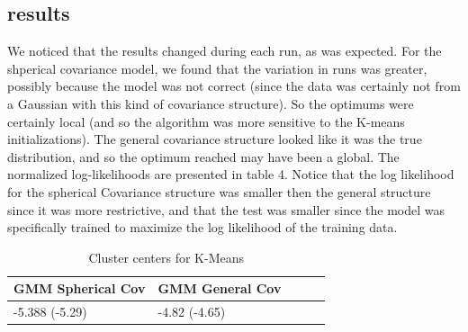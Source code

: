 \documentclass[paper=a4, fontsize=11pt]{scrartcl} %
\numberwithin{equation}{section} %
\numberwithin{figure}{section} %
\numberwithin{table}{section} %
\begin{document}
\subsection{results}

We noticed that the results changed during each run, as was expected. For the shperical covariance model, we found that the variation in runs was greater, possibly because the model was not correct (since the data was certainly not from a Gaussian with this kind of covariance structure). So the optimums were certainly local (and so the algorithm was more sensitive to the K-means initializations). The general covariance structure looked like it was the true distribution, and so the optimum reached may have been a global. The normalized log-likelihoods are presented in table 4. Notice that the log likelihood for the spherical Covariance structure was smaller then the general structure since it was more restrictive, and that the test was smaller since the model was specifically trained to maximize the log likelihood of the training data.

	\begin{table}
		\caption {Cluster centers for K-Means} \label{tab:title} 
		\begin{center}		
			\begin{tabular}{*5l}   
				\toprule
				GMM Spherical Cov & GMM General Cov
				\\\midrule
				-5.388 (-5.29) & -4.82 (-4.65) \\\bottomrule
				\hline
			\end{tabular}
		\end{center}
	\end{table}
\end{document}
